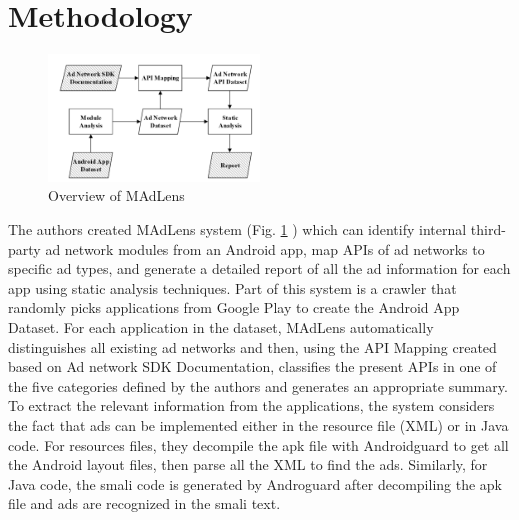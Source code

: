 \documentclass[conference]{IEEEtran}
\begin{document}
\section{Methodology}
\begin{figure}[htbp]
	\includegraphics[width=0.5\textwidth,height=0.5\textheight,keepaspectratio]{system.png}
	\caption{Overview of MAdLens}
	\label{fig:system}
\end{figure}
The authors created MAdLens system (Fig. \ref{fig:system} ) which can identify internal third-party ad network modules from an Android app, map APIs of ad networks to specific ad types, and generate a detailed report of all the ad information for each app using static analysis techniques. Part of this system is a crawler that randomly picks applications from Google Play to create the Android App Dataset. For each application in the dataset, MAdLens automatically distinguishes all existing ad networks and then, using the API Mapping created based on Ad network SDK Documentation, classifies the present APIs in one of the five categories defined by the authors and generates an appropriate summary. To extract the relevant information from the applications, the system considers the fact that ads can be implemented either in the resource file (XML) or in Java code. For resources files, they decompile the apk file with Androidguard to get all the Android layout files, then parse all the XML to find the ads. Similarly, for Java code, the smali code is generated by Androguard after decompiling the apk file and ads are recognized in the smali text.
\end{document}
